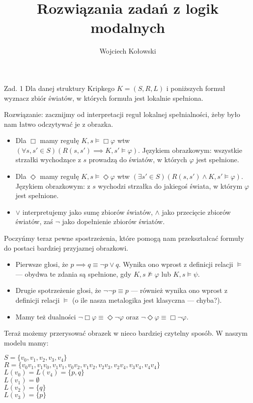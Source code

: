 \documentclass[11pt]{article}
\title{Rozwiązania zadań z logik modalnych}
\author{Wojciech Kołowski}
\date{}
\renewcommand{\phi}{\varphi}
\begin{document}
	\maketitle
	
	\par Zad. 1 Dla danej struktury Kripkego $K = (S, R, L)$ i poniższych formuł wyznacz zbiór światów, w których formuła jest lokalnie spełniona.
	\par Rozwiązanie: zacznijmy od interpretacji reguł lokalnej spełnialności, żeby było nam łatwo odczytywać je z obrazka.
	\begin{itemize}
		\item Dla $\Box$ mamy regułę $K, s \models \Box \phi$ wtw $(\forall s, s' \in S)(R(s, s') \implies K, s' \models \phi)$. Językiem obrazkowym: wszystkie strzałki wychodzące z $s$ prowadzą do światów, w których $\phi$ jest spełnione.
		\item Dla $\Diamond$ mamy regułę $K, s \models \Diamond \phi$ wtw $(\exists s' \in S)(R(s, s') \land K, s' \models \phi)$. Językiem obrazkowym: z $s$ wychodzi strzałka do jakiegoś świata, w którym $\phi$ jest spełnione.
		\item $\lor$ interpretujemy jako sumę zbiorów światów, $\land$ jako przecięcie zbiorów światów, zaś $\neg$ jako dopełnienie zbiorów światów.
	\end{itemize}
	\par Poczyńmy teraz pewne spostrzeżenia, które pomogą nam przekształcać formuły do postaci bardziej przyjaznej obrazkowi.
	\begin{itemize}
		\item Pierwsze głosi, że $p \implies q \equiv \neg p \lor q$. Wynika ono wprost z definicji relacji $\models$ — obydwa te zdania są spełnione, gdy $K, s \not\models \phi$ lub $K, s \models \psi$.
		\item Drugie spotrzeżenie głosi, że $\neg\neg p \equiv p$ — również wynika ono wprost z definicji relacji $\models$ (o ile nasza metalogika jest klasyczna — chyba?).
		\item Mamy też dualności $\neg \Box \phi \equiv \Diamond \neg \phi$ oraz $\neg \Diamond \phi \equiv \Box \neg \phi$.
	\end{itemize}

	\par Teraż możemy przerysować obrazek w nieco bardziej czytelny sposób. W naszym modelu mamy:
	\begin{center}
		$S = \{v_0, v_1, v_2, v_3, v_4\}$ \\
		$R = \{v_0 v_1, v_1 v_0, v_1 v_1, v_0 v_2, v_1 v_2, v_2 v_3, v_2 v_4, v_3 v_4, v_4 v_4\}$ \\
		$L(v_0) = L(v_4) = \{p, q\}$ \\
		$L(v_1) = \emptyset$ \\
		$L(v_2) = \{q\}$ \\
		$L(v_3) = \{p\}$
	\end{center}
	
\end{document}
